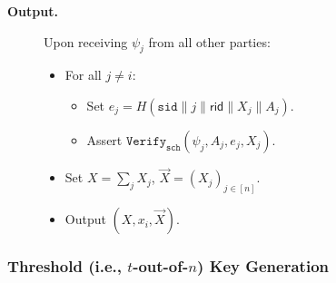 \documentclass[11pt]{article}
\newcommand{\sid}{\ensuremath{\mathtt{sid}}}
\newcommand{\verify}[1]{\ensuremath{\mathtt{Verify}_{\mathtt{#1}}}}
\newcommand{\rid}{\textsf{rid}}
\newcommand{\?}[1]{\stackrel{?}{#1}}
\begin{document}
\begin{description}
\item[\bf Output.] 
    Upon receiving $\psi_j$ from all other parties:
    \begin{itemize}
    \item 
        For all $j \ne i$:
        \begin{itemize}
            \item Set $e_j = H(\sid \| j \| \rid\|X_j\|A_j)$.
            \item Assert $\verify{sch}(\psi_j, A_j, e_j, X_j)$.
        \end{itemize}

    \item Set $X = \sum_j X_j$,
              $\vec X = (X_j)_{j\in[n]}$.

    \item Output $(X, x_i, \vec X)$.
    \end{itemize}

\end{description}

\subsubsection{Threshold (i.e., $t$-out-of-$n$) Key Generation}
\label{sec:t-of-n-dkg}
\end{document}
